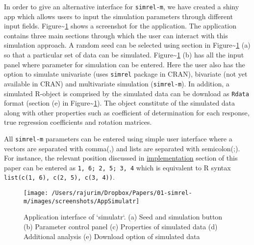 \documentclass[12pt,A4paper,authoryear]{elsarticle} %
\theoremstyle{definition}
\theoremstyle{definition}
\theoremstyle{remark}
\begin{document}
In order to give an alternative interface for \texttt{simrel-m}, we have
created a shiny app which allows users to input the simulation
parameters through different input fields.
Figure\textasciitilde{}\ref{fig:AppSimulatr} shows a screenshot for the
application. The application contains three main sections through which
the user can interact with this simulation approach. A random seed can
be selected using section in
Figure\textasciitilde{}\ref{fig:AppSimulatr} (a) so that a particular
set of data can be simulated.
Figure\textasciitilde{}\ref{fig:AppSimulatr} (b) has all the input panel
where parameter for simulation can be entered. Here the user also has
the option to simulate univariate (uses \texttt{simrel} package in
CRAN), bivariate (not yet available in CRAN) and multivariate simulation
(\texttt{simrel-m}). In addition, a simulated R-object is comprised by
the simulated data can be download as \texttt{Rdata} format (section (e)
in Figure\textasciitilde{}\ref{fig:AppSimulatr}). The object constitute
of the simulated data along with other properties such as coefficient of
determination for each response, true regression coefficients and
rotation matrices.

All \texttt{simrel-m} parameters can be entered using simple user
interface where a vectors are separated with comma(,) and lists are
separated with semicolon(;). For instance, the relevant position
discussed in \protect\hyperlink{implementation}{implementation} section
of this paper can be entered as \texttt{1,\ 6;\ 2,\ 5;\ 3,\ 4} which is
equivalent to R syntax \texttt{list(c(1,\ 6),\ c(2,\ 5),\ c(3,\ 4))}.

\begin{figure}[!htb]

{\centering \texttt{[image: /Users/rajurim/Dropbox/Papers/01-simrel-m/images/screenshots/AppSimulatr]} 

}

\caption{Application interface of `simulatr`. (a) Seed and simulation button (b) Parameter control panel (c) Properties of simulated data (d) Additional analysis (e) Download option of simulated data}\label{fig:AppSimulatr}
\end{figure}
\end{document}
